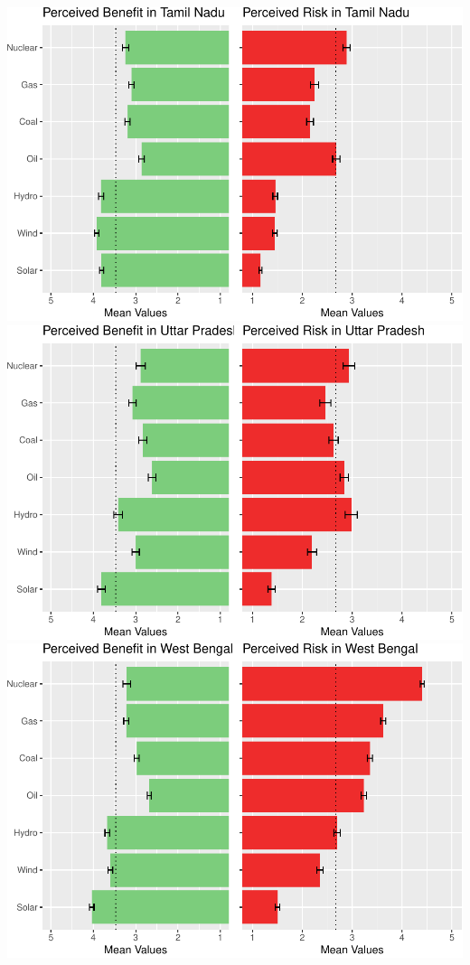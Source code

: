 \documentclass[
]{article}
\begin{document}
\includegraphics{nuclear-in-comparison_files/figure-latex/unnamed-chunk-18-3.pdf}
\includegraphics{nuclear-in-comparison_files/figure-latex/unnamed-chunk-18-4.pdf}
\includegraphics{nuclear-in-comparison_files/figure-latex/unnamed-chunk-18-5.pdf}
\end{document}
